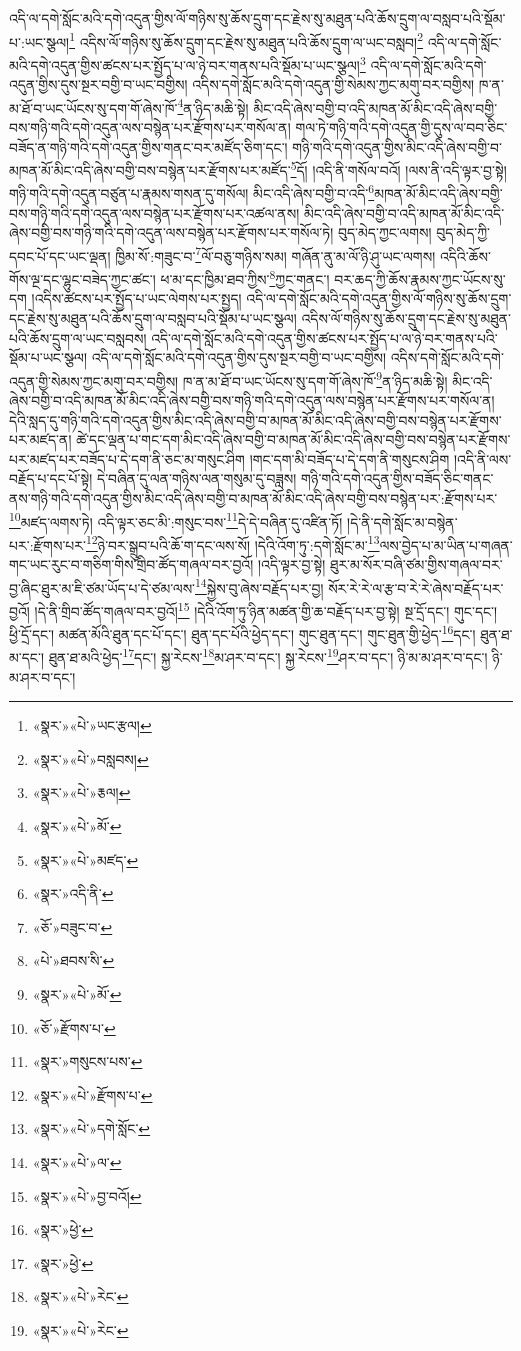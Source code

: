 འདི་ལ་དགེ་སློང་མའི་དགེ་འདུན་གྱིས་ལོ་གཉིས་སུ་ཆོས་དྲུག་དང་རྗེས་སུ་མཐུན་པའི་ཆོས་དྲུག་ལ་བསླབ་པའི་སྡོམ་པ་:ཡང་སྩལ།\footnote{«སྣར་»«པེ་»ཡང་རྩལ།} འདིས་ལོ་གཉིས་སུ་ཆོས་དྲུག་དང་རྗེས་སུ་མཐུན་པའི་ཆོས་དྲུག་ལ་ཡང་བསླབ།\footnote{«སྣར་»«པེ་»བསླབས།} འདི་ལ་དགེ་སློང་མའི་དགེ་འདུན་གྱིས་ཚངས་པར་སྤྱོད་པ་ལ་ཉེ་བར་གནས་པའི་སྡོམ་པ་ཡང་སྩལ།\footnote{«སྣར་»«པེ་»རྕལ།} འདི་ལ་དགེ་སློང་མའི་དགེ་འདུན་གྱིས་དུས་སྔར་བགྱི་བ་ཡང་བགྱིས། འདིས་དགེ་སློང་མའི་དགེ་འདུན་གྱི་སེམས་ཀྱང་མགུ་བར་བགྱིས། ཁ་ན་མ་ཐོ་བ་ཡང་ཡོངས་སུ་དག་གོ་ཞེས་ཁོ་\footnote{«སྣར་»«པེ་»མོ་}ན་ཉིད་མཆི་སྟེ། མིང་འདི་ཞེས་བགྱི་བ་འདི་མཁན་མོ་མིང་འདི་ཞེས་བགྱི་བས་གཉི་གའི་དགེ་འདུན་ལས་བསྙེན་པར་རྫོགས་པར་གསོལ་ན། གལ་ཏེ་གཉི་གའི་དགེ་འདུན་གྱི་དུས་ལ་བབ་ཅིང་བཟོད་ན་གཉི་གའི་དགེ་འདུན་གྱིས་གནང་བར་མཛོད་ཅིག་དང་། གཉི་གའི་དགེ་འདུན་གྱིས་མིང་འདི་ཞེས་བགྱི་བ་མཁན་མོ་མིང་འདི་ཞེས་བགྱི་བས་བསྙེན་པར་རྫོགས་པར་མཛོད་\footnote{«སྣར་»«པེ་»མཛད་}དོ། །འདི་ནི་གསོལ་བའོ། །ལས་ནི་འདི་ལྟར་བྱ་སྟེ། གཉི་གའི་དགེ་འདུན་བཙུན་པ་རྣམས་གསན་དུ་གསོལ། མིང་འདི་ཞེས་བགྱི་བ་འདི་\footnote{«སྣར་»འདི་ནི་}མཁན་མོ་མིང་འདི་ཞེས་བགྱི་བས་གཉི་གའི་དགེ་འདུན་ལས་བསྙེན་པར་རྫོགས་པར་འཚལ་ནས། མིང་འདི་ཞེས་བགྱི་བ་འདི་མཁན་མོ་མིང་འདི་ཞེས་བགྱི་བས་གཉི་གའི་དགེ་འདུན་ལས་བསྙེན་པར་རྫོགས་པར་གསོལ་ཏེ། བུད་མེད་ཀྱང་ལགས། བུད་མེད་ཀྱི་དབང་པོ་དང་ཡང་ལྡན། ཁྱིམ་སོ་:གཟུང་བ་\footnote{«ཅོ་»བཟུང་བ་}ལོ་བཅུ་གཉིས་སམ། གཞོན་ནུ་མ་ལོ་ཉི་ཤུ་ཡང་ལགས། འདིའི་ཆོས་གོས་ལྔ་དང་ལྷུང་བཟེད་ཀྱང་ཚང་། ཕ་མ་དང་ཁྱིམ་ཐབ་ཀྱིས་\footnote{«པེ་»ཐབས་ིས་}ཀྱང་གནང་། བར་ཆད་ཀྱི་ཆོས་རྣམས་ཀྱང་ཡོངས་སུ་དག །འདིས་ཚངས་པར་སྤྱོད་པ་ཡང་ལེགས་པར་སྤྱད། འདི་ལ་དགེ་སློང་མའི་དགེ་འདུན་གྱིས་ལོ་གཉིས་སུ་ཆོས་དྲུག་དང་རྗེས་སུ་མཐུན་པའི་ཆོས་དྲུག་ལ་བསླབ་པའི་སྡོམ་པ་ཡང་སྩལ། འདིས་ལོ་གཉིས་སུ་ཆོས་དྲུག་དང་རྗེས་སུ་མཐུན་པའི་ཆོས་དྲུག་ལ་ཡང་བསླབས། འདི་ལ་དགེ་སློང་མའི་དགེ་འདུན་གྱིས་ཚངས་པར་སྤྱོད་པ་ལ་ཉེ་བར་གནས་པའི་སྡོམ་པ་ཡང་སྩལ། འདི་ལ་དགེ་སློང་མའི་དགེ་འདུན་གྱིས་དུས་སྔར་བགྱི་བ་ཡང་བགྱིས། འདིས་དགེ་སློང་མའི་དགེ་འདུན་གྱི་སེམས་ཀྱང་མགུ་བར་བགྱིས། ཁ་ན་མ་ཐོ་བ་ཡང་ཡོངས་སུ་དག་གོ་ཞེས་ཁོ་\footnote{«སྣར་»«པེ་»མོ་}ན་ཉིད་མཆི་སྟེ། མིང་འདི་ཞེས་བགྱི་བ་འདི་མཁན་མོ་མིང་འདི་ཞེས་བགྱི་བས་གཉི་གའི་དགེ་འདུན་ལས་བསྙེན་པར་རྫོགས་པར་གསོལ་ན། དེའི་སླད་དུ་གཉི་གའི་དགེ་འདུན་གྱིས་མིང་འདི་ཞེས་བགྱི་བ་མཁན་མོ་མིང་འདི་ཞེས་བགྱི་བས་བསྙེན་པར་རྫོགས་པར་མཛད་ན། ཚེ་དང་ལྡན་པ་གང་དག་མིང་འདི་ཞེས་བགྱི་བ་མཁན་མོ་མིང་འདི་ཞེས་བགྱི་བས་བསྙེན་པར་རྫོགས་པར་མཛད་པར་བཟོད་པ་དེ་དག་ནི་ཅང་མ་གསུང་ཤིག །གང་དག་མི་བཟོད་པ་དེ་དག་ནི་གསུངས་ཤིག །འདི་ནི་ལས་བརྗོད་པ་དང་པོ་སྟེ། དེ་བཞིན་དུ་ལན་གཉིས་ལན་གསུམ་དུ་བཟླས། གཉི་གའི་དགེ་འདུན་གྱིས་བཟོད་ཅིང་གནང་ནས་གཉི་གའི་དགེ་འདུན་གྱིས་མིང་འདི་ཞེས་བགྱི་བ་མཁན་མོ་མིང་འདི་ཞེས་བགྱི་བས་བསྙེན་པར་:རྫོགས་པར་\footnote{«ཅོ་»རྫོགས་པ་}མཛད་ལགས་ཏེ། འདི་ལྟར་ཅང་མི་:གསུང་བས་\footnote{«སྣར་»གསུངས་པས་}དེ་དེ་བཞིན་དུ་འཛིན་ཏོ། །དེ་ནི་དགེ་སློང་མ་བསྙེན་པར་:རྫོགས་པར་\footnote{«སྣར་»«པེ་»རྫོགས་པ་}ཉེ་བར་སྒྲུབ་པའི་ཆོ་ག་དང་ལས་སོ། །དེའི་འོག་ཏུ་:དགེ་སློང་མ་\footnote{«སྣར་»«པེ་»དགེ་སློང་}ལས་བྱེད་པ་མ་ཡིན་པ་གཞན་གང་ཡང་རུང་བ་གཅིག་གིས་གྲིབ་ཚོད་གཞལ་བར་བྱའོ། །འདི་ལྟར་བྱ་སྟེ། ཐུར་མ་སོར་བཞི་ཙམ་གྱིས་གཞལ་བར་བྱ་ཞིང་ཐུར་མ་ཇི་ཙམ་ཡོད་པ་དེ་ཙམ་ལས་\footnote{«སྣར་»«པེ་»ལ་}སྐྱེས་བུ་ཞེས་བརྗོད་པར་བྱ། སོར་རེ་རེ་ལ་རྩ་བ་རེ་རེ་ཞེས་བརྗོད་པར་བྱའོ། །དེ་ནི་གྲིབ་ཚོད་གཞལ་བར་བྱའོ།\footnote{«སྣར་»«པེ་»བྱ་བའོ།} །དེའི་འོག་ཏུ་ཉིན་མཚན་གྱི་ཆ་བརྗོད་པར་བྱ་སྟེ། སྔ་དྲོ་དང་། གུང་དང་། ཕྱི་དྲོ་དང་། མཚན་མོའི་ཐུན་དང་པོ་དང་། ཐུན་དང་པོའི་ཕྱེད་དང་། གུང་ཐུན་དང་། གུང་ཐུན་གྱི་ཕྱེད་\footnote{«སྣར་»ཕྱེ་}དང་། ཐུན་ཐ་མ་དང་། ཐུན་ཐ་མའི་ཕྱེད་\footnote{«སྣར་»ཕྱེ་}དང་། སྐྱ་རེངས་\footnote{«སྣར་»«པེ་»རེང་}མ་ཤར་བ་དང་། སྐྱ་རེངས་\footnote{«སྣར་»«པེ་»རེང་}ཤར་བ་དང་། ཉི་མ་མ་ཤར་བ་དང་། ཉི་མ་ཤར་བ་དང་། 